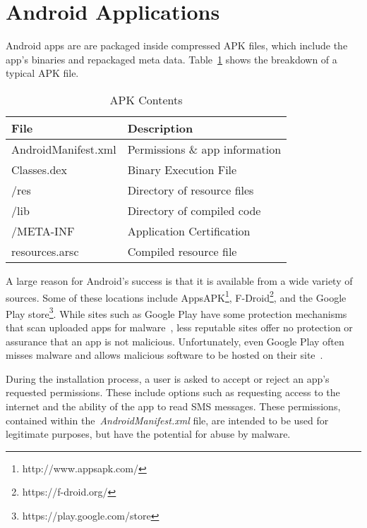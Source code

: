 \documentclass{sig-alternate}
\begin{document}
\section{Android Applications}
\label{sec: androidapplications}

Android apps are are packaged inside compressed APK files, which include the app's binaries and repackaged meta data. Table~\ref{Table:apkcontents} shows the breakdown of a typical APK file.

\begin{table}[h]
\begin{center}
\caption{APK Contents}
\label{Table:apkcontents}
  \begin{tabular}{| l | l | } \hline

    \bfseries File & \bfseries Description \\ \hline
    AndroidManifest.xml & Permissions \& app information \\ \hline
    Classes.dex & Binary Execution File \\ \hline
    /res & Directory of resource files \\ \hline
    /lib & Directory of compiled code \\ \hline
    /META-INF & Application Certification \\ \hline
    resources.arsc & Compiled resource file \\ \hline
  \end{tabular}
  \end{center}
\end{table}

A large reason for Android's success is that it is available from a wide variety of sources. Some of these locations include AppsAPK\footnote{http://www.appsapk.com/}, F-Droid\footnote{https://f-droid.org/}, and the Google Play store\footnote{https://play.google.com/store}. While sites such as Google Play have some protection mechanisms that scan uploaded apps for malware~\cite{bouncer_url1}, less reputable sites offer no protection or assurance that an app is not malicious. Unfortunately, even Google Play often misses malware and allows malicious software to be hosted on their site~\cite{Zhou:2012:DAM:2310656.2310710}.

During the installation process, a user is asked to accept or reject an app's requested permissions. These include options such as requesting access to the internet and the ability of the app to read SMS messages. These permissions, contained within the~\emph{AndroidManifest.xml} file, are intended to be used for legitimate purposes, but have the potential for abuse by malware.
\end{document}
